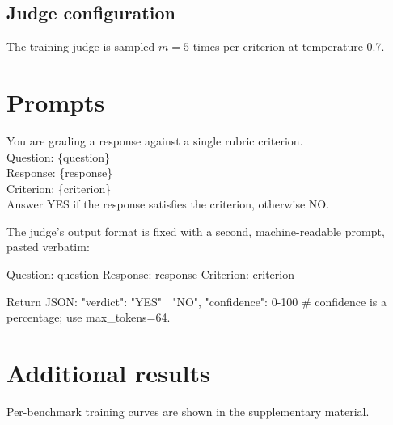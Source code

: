 \documentclass[palette=navy,titlestyle=rigorous,titlealign=center]{inkpaper}
\begin{document}
\subsection{Judge configuration}
\label{app:judge}
The training judge is sampled $m=5$ times per criterion at temperature 0.7.

\section{Prompts}

\begin{promptbox}
You are grading a response against a single rubric criterion.\\[0.4em]
Question: \{question\}\\
Response: \{response\}\\
Criterion: \{criterion\}\\[0.4em]
Answer YES if the response satisfies the criterion, otherwise NO.
\end{promptbox}

The judge's output format is fixed with a second, machine-readable prompt,
pasted verbatim:
\begin{promptbox*}
Question: {question}
Response: {response}
Criterion: {criterion}

Return JSON: {"verdict": "YES" | "NO", "confidence": 0-100}
# confidence is a percentage; use max_tokens=64.
\end{promptbox*}

\section{Additional results}
Per-benchmark training curves are shown in the supplementary material.
\end{document}
